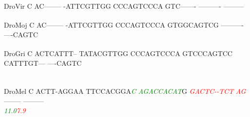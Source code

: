\documentclass[11pt,twoside,reqno,a4paper]{article}
\begin{document}
{DroVir	C	AC--------	-ATTCGTTGG	CCCAGTCCCA	GTC-------	----------	---------\\
\hspace*{7\charwidth}\hspace*{1\charwidth}\hspace*{1\charwidth}\hspace*{1\charwidth}\hspace*{1\charwidth}\hspace*{1\charwidth}\hspace*{1\charwidth}\\
DroMoj	C	AC--------	-ATTCGTTGG	CCCAGTCCCA	GTGGCAGTCG	----------	----CAGTC\\
\hspace*{7\charwidth}\hspace*{1\charwidth}\hspace*{1\charwidth}\hspace*{1\charwidth}\hspace*{1\charwidth}\hspace*{1\charwidth}\hspace*{1\charwidth}\\
DroGri	C	ACTCATTT--	TATACGTTGG	CCCAGTCCCA	GTCCCAGTCC	CATTTGT---	----CAGTC\\
\hspace*{7\charwidth}\hspace*{1\charwidth}\hspace*{1\charwidth}\hspace*{1\charwidth}\hspace*{1\charwidth}\hspace*{1\charwidth}\hspace*{1\charwidth}\\
\\
DroMel	C	ACTT-AGGAA	TTCCACGGA\textit{\textcolor{Green}{C}}	\textit{\textcolor{Green}{A}}\textit{\textcolor{Green}{G}}\textit{\textcolor{Green}{A}}\textit{\textcolor{Green}{C}}\textit{\textcolor{Green}{C}}\textit{\textcolor{Green}{A}}\textit{\textcolor{Green}{C}}\textit{\textcolor{Green}{A}}\textit{\textcolor{Green}{T}}G	\textit{\textcolor{Red}{G}}\textit{\textcolor{Red}{A}}\textit{\textcolor{Red}{C}}\textit{\textcolor{Red}{T}}\textit{\textcolor{Red}{C}}\textit{\textcolor{Red}{-}}\textit{\textcolor{Red}{-}}\textit{\textcolor{Red}{T}}\textit{\textcolor{Red}{C}}\textit{\textcolor{Red}{T}}	\textit{\textcolor{Red}{A}}\textit{\textcolor{Red}{G}}--------	---------\\
\hspace*{7\charwidth}\hspace*{1\charwidth}\hspace*{1\charwidth}\hspace*{20\charwidth}\textit{\textcolor{Green}{11.0}}\hspace*{1\charwidth}\hspace*{1\charwidth}\hspace*{7\charwidth}\textit{\textcolor{Red}{7.9}}\hspace*{1\charwidth}\hspace*{1\charwidth}\\
}
\end{document}
